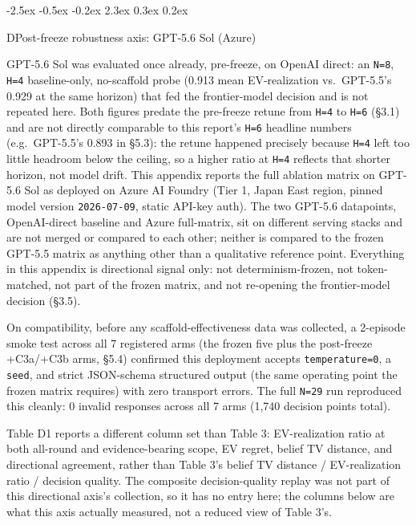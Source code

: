 \documentclass[
  11pt,
]{article}
\makeatletter
\renewcommand{\section}{%
  \@startsection{section}{1}{\z@}%
                {-2.5ex \@plus -0.5ex \@minus -0.2ex}%
                { 2.3ex \@plus  0.3ex \@minus  0.2ex}%
                {\large\bf\raggedright}%
}
\makeatother
\begin{document}
\section{D\quad Post-freeze robustness axis: GPT-5.6 Sol (Azure)}\label{d-post-freeze-robustness-axis-gpt-5.6-sol-azure}

GPT-5.6 Sol was evaluated once already, pre-freeze, on OpenAI direct: an \texttt{N=8}, \texttt{H=4} baseline-only, no-scaffold probe (0.913 mean EV-realization vs.~GPT-5.5's 0.929 at the same horizon) that fed the frontier-model decision and is not repeated here. Both figures predate the pre-freeze retune from \texttt{H=4} to \texttt{H=6} (§3.1) and are not directly comparable to this report's \texttt{H=6} headline numbers (e.g.~GPT-5.5's 0.893 in §5.3): the retune happened precisely because \texttt{H=4} left too little headroom below the ceiling, so a higher ratio at \texttt{H=4} reflects that shorter horizon, not model drift. This appendix reports the full ablation matrix on GPT-5.6 Sol as deployed on Azure AI Foundry (Tier 1, Japan East region, pinned model version \texttt{2026-07-09}, static API-key auth). The two GPT-5.6 datapoints, OpenAI-direct baseline and Azure full-matrix, sit on different serving stacks and are not merged or compared to each other; neither is compared to the frozen GPT-5.5 matrix as anything other than a qualitative reference point. Everything in this appendix is directional signal only: not determinism-frozen, not token-matched, not part of the frozen matrix, and not re-opening the frontier-model decision (§3.5).

On compatibility, before any scaffold-effectiveness data was collected, a 2-episode smoke test across all 7 registered arms (the frozen five plus the post-freeze +C3a/+C3b arms, §5.4) confirmed this deployment accepts \texttt{temperature=0}, a \texttt{seed}, and strict JSON-schema structured output (the same operating point the frozen matrix requires) with zero transport errors. The full \texttt{N=29} run reproduced this cleanly: 0 invalid responses across all 7 arms (1,740 decision points total).

Table D1 reports a different column set than Table 3: EV-realization ratio at both all-round and evidence-bearing scope, EV regret, belief TV distance, and directional agreement, rather than Table 3's belief TV distance / EV-realization ratio / decision quality. The composite decision-quality replay was not part of this directional axis's collection, so it has no entry here; the columns below are what this axis actually measured, not a reduced view of Table 3's.
\end{document}

